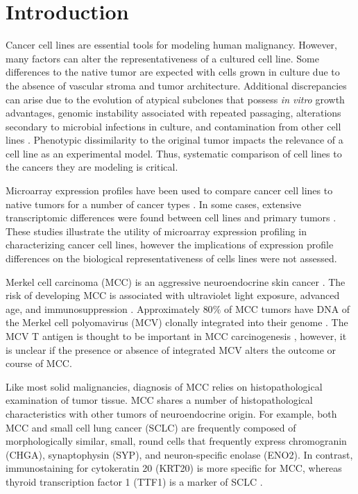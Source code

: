 \documentclass[10pt]{article}
\begin{document}
\section*{Introduction}
Cancer cell lines are essential tools for modeling human malignancy.
However, many factors can alter the representativeness of a cultured cell line.
Some differences to the native tumor are expected with cells grown in culture due to the absence of vascular stroma and tumor architecture.
Additional discrepancies can arise due to the evolution of atypical subclones that possess \emph{in vitro} growth advantages, genomic instability associated with repeated passaging, alterations secondary to microbial infections in culture, and contamination from other cell lines \citep{Barallon2010Recommendation,CapesDavis2010Check}.
Phenotypic dissimilarity to the original tumor impacts the relevance of a cell line as an experimental model.
Thus, systematic comparison of cell lines to the cancers they are modeling is critical.

Microarray expression profiles have been used to compare cancer cell lines to native tumors for a number of cancer types \citep{Barretina2012Cancer,Carlson2007Quantitative,Wang2006Comparative,Gillet2011Redefining,Khan2001Classification,Li2008Genomic}.
In some cases, extensive transcriptomic differences were found between cell lines and primary tumors \citep{Li2008Genomic,Wang2006Comparative}.
These studies illustrate the utility of microarray expression profiling in characterizing cancer cell lines, however the implications of expression profile differences on the biological representativeness of cells lines were not assessed.

Merkel cell carcinoma (MCC) is an aggressive neuroendocrine skin cancer  \citep{Toker1972Trabecular,Maricich2009Merkel,Maricich2012Rodents}.
The risk of developing MCC is associated with ultraviolet light exposure, advanced age, and immunosuppression \citep{Hodgson2005Merkel,Becker2010Merkel}.
Approximately $80\%$ of MCC tumors have DNA of the Merkel cell polyomavirus (MCV) clonally integrated into their genome \citep{Feng2008Clonal}.
The MCV T antigen is thought to be important in MCC carcinogenesis \citep{Houben2010Merkel}, however, it is unclear if the presence or absence of integrated MCV alters the outcome or course of MCC.

Like most solid malignancies, diagnosis of MCC relies on histopathological examination of tumor tissue.
MCC shares a number of histopathological characteristics with other tumors of neuroendocrine origin.
For example, both MCC and small cell lung cancer (SCLC) are frequently composed of morphologically similar, small, round cells that frequently express chromogranin (CHGA), synaptophysin (SYP), and neuron-specific enolase (ENO2).
In contrast, immunostaining for cytokeratin 20 (KRT20) is more specific for MCC, whereas thyroid transcription factor 1 (TTF1) is a marker of SCLC \citep{Leech2001Merkel,Pulitzer2009Merkel}.
\end{document}
